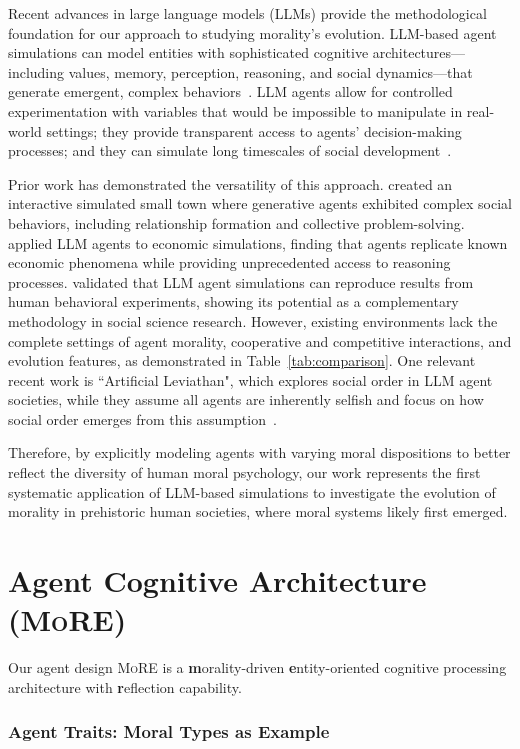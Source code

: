 \documentclass[letterpaper]{article} %
\newcommand{\agentframe}{\textsc{MoRE}\xspace}
\begin{document}
Recent advances in large language models (LLMs) provide the methodological foundation for our approach to studying morality's evolution. LLM-based agent simulations can model entities with sophisticated cognitive architectures—including values, memory, perception, reasoning, and social dynamics—that generate emergent, complex behaviors~\citep{park2023generative, horton2023large}.
LLM agents allow for controlled experimentation with variables that would be impossible to manipulate in real-world settings; they provide transparent access to agents' decision-making processes; and they can simulate long timescales of social development~\citep{piao2025agentsociety}.

Prior work has demonstrated the versatility of this approach. \citet{park2023generative} created an interactive simulated small town where generative agents exhibited complex social behaviors, including relationship formation and collective problem-solving. \citet{horton2023large} applied LLM agents to economic simulations, finding that agents replicate known economic phenomena while providing unprecedented access to reasoning processes. \citet{aher2023using} validated that LLM agent simulations can reproduce results from human behavioral experiments, showing its potential as a complementary methodology in social science research.
However, existing environments lack the complete settings of agent morality, cooperative and competitive interactions, and evolution features, as demonstrated in Table~\ref{tab:comparison}.
One relevant recent work is ``Artificial Leviathan", which explores social order in LLM agent societies, while they assume all agents are inherently selfish and focus on how social order emerges from this assumption~\citep{dai2024artificial}.

Therefore, by explicitly modeling agents with varying moral dispositions to better reflect the diversity of human moral psychology, our work represents the first systematic application of LLM-based simulations to investigate the evolution of morality in prehistoric human societies, where moral systems likely first emerged.

\section{Agent Cognitive Architecture (\agentframe)}
Our agent design \agentframe is a \textbf{m}orality-driven \textbf{e}ntity-oriented cognitive processing architecture with \textbf{r}eflection capability.

\subsubsection{Agent Traits: Moral Types as Example}
\end{document}
